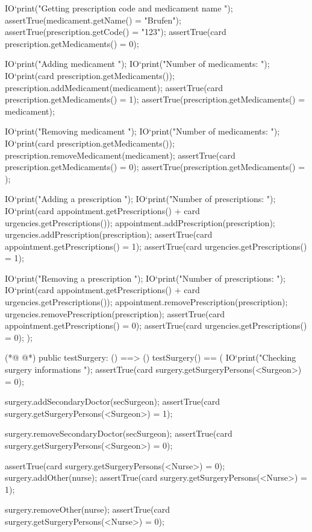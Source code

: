 \begin{vdmpp}[breaklines=true]
   IO`print("\n\n Getting prescription code and medicament name \n");
   assertTrue(medicament.getName() = "Brufen");
   assertTrue(prescription.getCode() = "123");
   assertTrue(card prescription.getMedicaments() = 0);
   
   IO`print("\n Adding medicament \n");
   IO`print("\n Number of medicaments: ");
   IO`print(card prescription.getMedicaments());
   prescription.addMedicament(medicament);
   assertTrue(card prescription.getMedicaments() = 1);
   assertTrue(prescription.getMedicaments() = {medicament});
   
   IO`print("\n\n Removing medicament \n");
   IO`print("\n Number of medicaments: ");
   IO`print(card prescription.getMedicaments());
   prescription.removeMedicament(medicament);
   assertTrue(card prescription.getMedicaments() = 0);
   assertTrue(prescription.getMedicaments() = {});
   
   IO`print("\n Adding a prescription \n");
   IO`print("\n Number of prescriptions: ");
   IO`print(card appointment.getPrescriptions() + card urgencies.getPrescriptions());
   appointment.addPrescription(prescription);
   urgencies.addPrescription(prescription);
   assertTrue(card appointment.getPrescriptions() = 1);
   assertTrue(card urgencies.getPrescriptions() = 1);
   
   IO`print("\n\n Removing a prescription \n");
   IO`print("\n Number of prescriptions: ");
   IO`print(card appointment.getPrescriptions() + card urgencies.getPrescriptions());
   appointment.removePrescription(prescription);
   urgencies.removePrescription(prescription);
   assertTrue(card appointment.getPrescriptions() = 0);
   assertTrue(card urgencies.getPrescriptions() = 0);
  );
  
(*@
\label{testSurgery:224}
@*)
 public testSurgery: () ==> ()
  testSurgery() == (
   IO`print("\n Checking surgery informations \n");
   assertTrue(card surgery.getSurgeryPersons(<Surgeon>) = 0);
   
   surgery.addSecondaryDoctor(secSurgeon);
   assertTrue(card surgery.getSurgeryPersons(<Surgeon>) = 1);
  
   surgery.removeSecondaryDoctor(secSurgeon);
   assertTrue(card surgery.getSurgeryPersons(<Surgeon>) = 0);
   
   assertTrue(card surgery.getSurgeryPersons(<Nurse>) = 0);
   surgery.addOther(nurse);
   assertTrue(card surgery.getSurgeryPersons(<Nurse>) = 1);
   
   surgery.removeOther(nurse);
   assertTrue(card surgery.getSurgeryPersons(<Nurse>) = 0);
   

\end{vdmpp}
